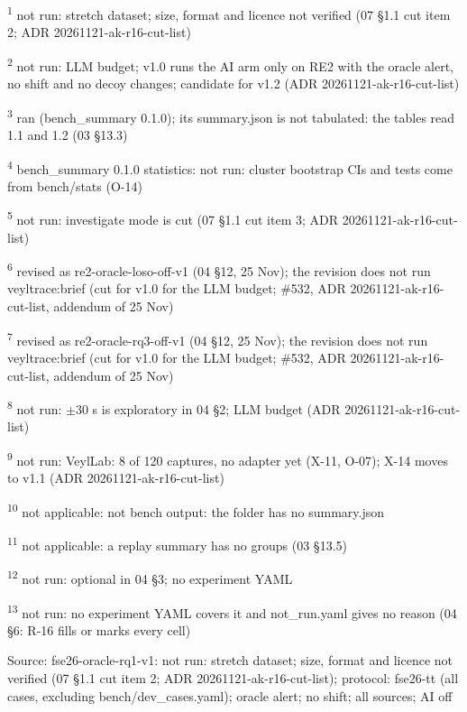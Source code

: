 \par\raggedright\noindent
\textsuperscript{1} not run: stretch dataset; size, format and licence not verified (07 \S{}1.1 cut item 2; ADR 20261121-ak-r16-cut-list)\par
\textsuperscript{2} not run: LLM budget; v1.0 runs the AI arm only on RE2 with the oracle alert, no shift and no decoy changes; candidate for v1.2 (ADR 20261121-ak-r16-cut-list)\par
\textsuperscript{3} ran (bench\_summary 0.1.0); its summary.json is not tabulated: the tables read 1.1 and 1.2 (03 \S{}13.3)\par
\textsuperscript{4} bench\_summary 0.1.0 statistics: not run: cluster bootstrap CIs and tests come from bench/\allowbreak{}stats (O-14)\par
\textsuperscript{5} not run: investigate mode is cut (07 \S{}1.1 cut item 3; ADR 20261121-ak-r16-cut-list)\par
\textsuperscript{6} revised as re2-oracle-loso-off-v1 (04 \S{}12, 25 Nov); the revision does not run veyltrace:brief (cut for v1.0 for the LLM budget; \#532, ADR 20261121-ak-r16-cut-list, addendum of 25 Nov)\par
\textsuperscript{7} revised as re2-oracle-rq3-off-v1 (04 \S{}12, 25 Nov); the revision does not run veyltrace:brief (cut for v1.0 for the LLM budget; \#532, ADR 20261121-ak-r16-cut-list, addendum of 25 Nov)\par
\textsuperscript{8} not run: $\pm$30 s is exploratory in 04 \S{}2; LLM budget (ADR 20261121-ak-r16-cut-list)\par
\textsuperscript{9} not run: VeylLab: 8 of 120 captures, no adapter yet (X-11, O-07); X-14 moves to v1.1 (ADR 20261121-ak-r16-cut-list)\par
\textsuperscript{10} not applicable: not bench output: the folder has no summary.json\par
\textsuperscript{11} not applicable: a replay summary has no groups (03 \S{}13.5)\par
\textsuperscript{12} not run: optional in 04 \S{}3; no experiment YAML\par
\textsuperscript{13} not run: no experiment YAML covers it and not\_run.yaml gives no reason (04 \S{}6: R-16 fills or marks every cell)\par
\noindent Source: fse26-oracle-rq1-v1: not run: stretch dataset; size, format and licence not verified (07 \S{}1.1 cut item 2; ADR 20261121-ak-r16-cut-list); protocol: fse26-tt (all cases, excluding bench/\allowbreak{}dev\_cases.yaml); oracle alert; no shift; all sources; AI off\par
